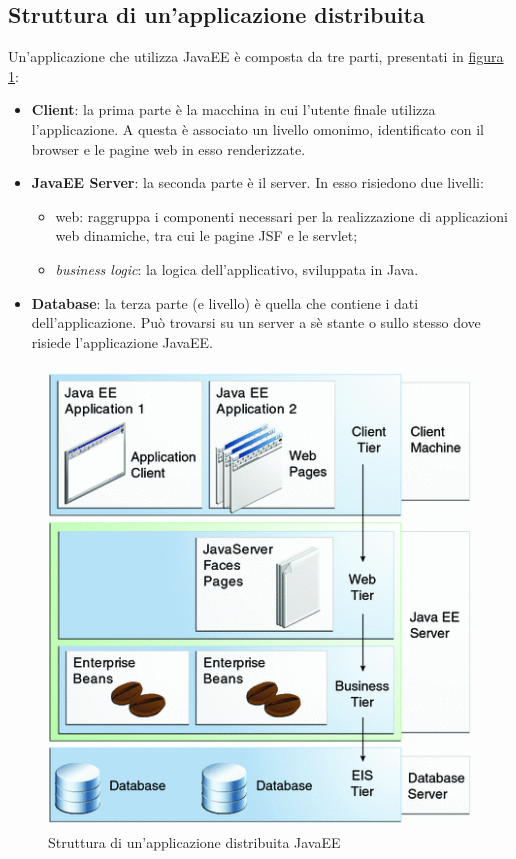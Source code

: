 \subsection{Struttura di un'applicazione distribuita}
Un'applicazione che utilizza JavaEE è composta da tre parti, presentati in \hyperref[fig:javaee-livelli]{figura \ref{fig:javaee-livelli}}\autocite{bib:javaee-tutorial}\autocite{bib:javaee-tutorial}:
\begin{itemize}
	\item \textbf{Client}: la prima parte è la macchina in cui l'utente finale utilizza l'applicazione. A questa è associato un livello omonimo, identificato con il browser e le pagine web in esso renderizzate.
	\item \textbf{JavaEE Server}: la seconda parte è il server. In esso risiedono due livelli:
	\begin{itemize}
		\item web: raggruppa i componenti necessari per la realizzazione di applicazioni web dinamiche, tra cui le pagine JSF e le servlet;
		\item \textit{business logic}: la logica dell'applicativo, sviluppata in Java.
	\end{itemize}
	\item \textbf{Database}: la terza parte (e livello) è quella che contiene i dati dell'applicazione. Può trovarsi su un server a sè stante o sullo stesso dove risiede l'applicazione JavaEE.
\end{itemize}
\begin{figure}
	\centering
	\includegraphics{Immagini/javaee-struttura.png}
	\caption{Struttura di un'applicazione distribuita JavaEE}
	\label{fig:javaee-livelli}
\end{figure}

